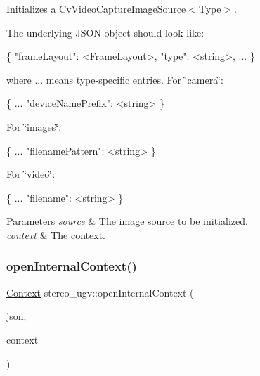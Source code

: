 Initializes a Cv\+Video\+Capture\+Image\+Source$<$\+Type$>$. 

The underlying J\+S\+ON object should look like\+: 
\begin{DoxyCode}
\{
  \textcolor{stringliteral}{"frameLayout"}: <FrameLayout>,
  \textcolor{stringliteral}{"type"}: <\textcolor{keywordtype}{string}>,
  ...
\}
\end{DoxyCode}
 where ... means type-\/specific entries. For \char`\"{}camera\char`\"{}\+: 
\begin{DoxyCode}
\{
  ...
  \textcolor{stringliteral}{"deviceNamePrefix"}: <\textcolor{keywordtype}{string}>
\}
\end{DoxyCode}
 For \char`\"{}images\char`\"{}\+: 
\begin{DoxyCode}
\{
  ...
  \textcolor{stringliteral}{"filenamePattern"}: <\textcolor{keywordtype}{string}>
\}
\end{DoxyCode}
 For \char`\"{}video\char`\"{}\+: 
\begin{DoxyCode}
\{
  ...
  \textcolor{stringliteral}{"filename"}: <\textcolor{keywordtype}{string}>
\}
\end{DoxyCode}
 
\begin{DoxyParams}{Parameters}
{\em source} & The image source to be initialized. \\
\hline
{\em context} & The context. \\
\hline
\end{DoxyParams}
\mbox{\label{namespacestereo__ugv_aef8f9a951e11f9d5d178db99754aac4b}} 
\subsubsection{\texorpdfstring{open\+Internal\+Context()}{openInternalContext()}}
{\footnotesize\ttfamily \hyperlink{classstereo__ugv_1_1Context}{Context} stereo\+\_\+ugv\+::open\+Internal\+Context (\begin{DoxyParamCaption}\item[{nlohmann\+::json $\ast$}]{json,  }\item[{const \hyperlink{classstereo__ugv_1_1Context}{Context} \&}]{context }\end{DoxyParamCaption})}



